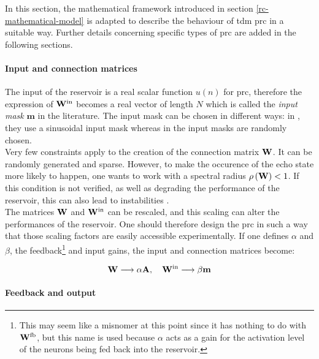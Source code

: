 In this section, the mathematical framework introduced in section \ref{rc-mathematical-model} is adapted to describe the behaviour of \gls{tdm} \gls{prc} in a suitable way. Further details concerning specific types of \gls{prc} are added in the following sections.

\paragraph{Input and connection matrices}

The input of the reservoir is a real scalar function $u(n)$ for \gls{prc}, therefore the expression of $\mathbf{W}^{\text{in}}$ becomes a real vector of length $N$ which is called the \textit{input mask} $\mathbf{m}$ in the literature. The input mask can be chosen in different ways: in \cite{Duport2016}, they use a sinusoidal input mask whereas in \cite{Antonik2017, Vinckier2015, Paquot2012} the input masks are randomly chosen.\\

Very few constraints apply to the creation of the connection matrix $\mathbf{W}$. It can be randomly generated and sparse. However, to make the occurence of the echo state more likely to happen, one wants to work with a spectral radius $\rho \left( \mathbf{W} \right)<1$. If this condition is not verified, as well as degrading the performance of the reservoir, this can also lead to instabilities \cite{Lukoeviius2009}.\\

The matrices $\mathbf{W}$ and $\mathbf{W}^{\text{in}}$ can be rescaled, and this scaling can alter the performances of the reservoir. One should therefore design the \gls{prc} in such a way that those scaling factors are easily accessible experimentally. If one defines $\alpha$ and $\beta$, the feedback\footnote{This may seem like a misnomer at this point since it has nothing to do with $\mathbf{W}^{\text{fb}}$, but this name is used because $\alpha$ acts as a gain for the activation level of the neurons being fed back into the reservoir.} and input gains, the input and connection matrices become:

\begin{equation}
	\mathbf{W} \longrightarrow \alpha \mathbf{A}, \quad \mathbf{W}^{\text{in}} \longrightarrow \beta \mathbf{m}
\end{equation}

\paragraph{Feedback and output}

